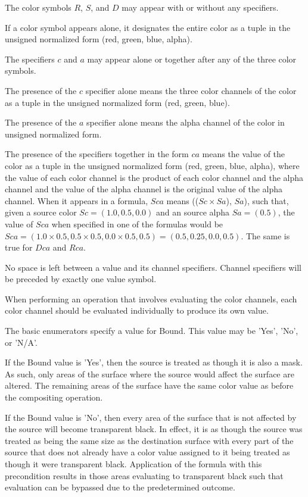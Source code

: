 \pnum
The color symbols $R$, $S$, and $D$ may appear with or without any specifiers.

\pnum 
If a color symbol appears alone, it designates the entire color as a tuple in 
the unsigned normalized form (red, green, blue, alpha).

\pnum
The specifiers $c$ and $a$ may appear alone or together after any of the three 
color symbols.

\pnum
The presence of the $c$ specifier alone means the three color channels of the 
color as a tuple in the unsigned normalized form (red, green, blue).

\pnum
The presence of the $a$ specifier alone means the alpha channel of the color in 
unsigned normalized form.

\pnum
The presence of the specifiers together in the form $ca$ means the 
value of the color as a tuple in the unsigned normalized form (red, green, 
blue, alpha), where the value of each color channel is the product of each 
color channel and the alpha channel and the value of the alpha channel is the 
original value of the alpha channel.
\enterexample
When it appears in a formula, $Sca$ means (($Sc \times Sa$), $Sa$), such that, 
given a source color $Sc = (1.0, 0.5, 0.0)$ and an source alpha $Sa = (0.5)$, 
the value of $Sca$ when specified in one of the formulas would be $Sca = (1.0 
\times 0.5, 0.5 \times 0.5, 0.0 \times 0.5, 0.5) = (0.5, 0.25, 0.0, 0.5)$. The 
same is true for $Dca$ and $Rca$.
\exitexample

\pnum
No space is left between a value and its channel specifiers. Channel 
specifiers will be preceded by exactly one value symbol.

\pnum
When performing an operation that involves evaluating the color 
channels, each color channel should be evaluated individually to produce its 
own value.

\pnum
The basic enumerators specify a value for Bound. This value may be 'Yes', 
'No', or 'N/A'.

\pnum
If the Bound value is 'Yes', then the source is treated as though it is 
also a mask. As such, only areas of the surface where the source would affect 
the surface are altered. The remaining areas of the surface have the same color 
value as before the compositing operation.

\pnum
If the Bound value is 'No', then every area of the surface that is not 
affected by the source will become transparent black. In effect, it is as 
though the source was treated as being the same size as the destination surface 
with every part of the source that does not already have a color value assigned 
to it being treated as though it were transparent black. Application of the 
formula with this precondition results in those areas evaluating to transparent 
black such that evaluation can be bypassed due to the predetermined outcome.

